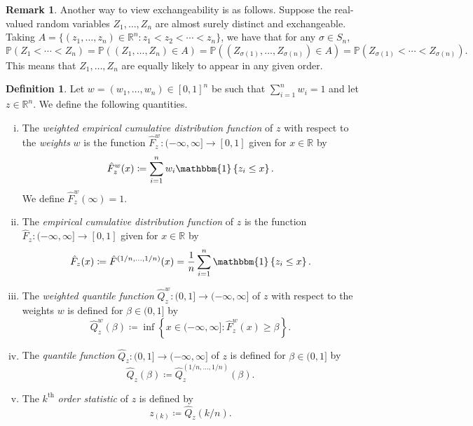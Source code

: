 \documentclass[11pt, titlepage]{article} %
\newcommand{\R}{\mathrm}
\newcommand{\Prob}[1]{\mathbb{P}\left( #1 \right)}
\newcommand{\Ind}[1]{\mathbbm{1}\left\{ #1 \right\}}
\numberwithin{equation}{section}
\theoremstyle{definition}
\newtheorem{definition}{Definition}
\newtheorem{remark}{Remark}
\numberwithin{theorem}{section}
\numberwithin{lemma}{section}
\numberwithin{corollary}{section}
\numberwithin{proposition}{section}
\numberwithin{definition}{section}
\numberwithin{remark}{section}
\begin{document}
\begin{remark}
    Another way to view exchangeability is as follows. Suppose the real-valued random variables \(Z_1, \ldots, Z_n\) are almost surely distinct and exchangeable. Taking \(A = \{(z_1, \ldots, z_n) \in \mathbb{R}^n : z_1 < z_2 < \cdots < z_n \}\), we have that for any \(\sigma \in S_n\), \[\Prob{Z_1 < \cdots < Z_n} = \Prob{(Z_1, \ldots, Z_n) \in A} = \Prob{(Z_{\sigma(1)}, \ldots, Z_{\sigma(n)}) \in A} = \Prob{Z_{\sigma(1)} < \cdots < Z_{\sigma(n)}}.\] This means that \(Z_1, \ldots, Z_n\) are equally likely to appear in any given order.
\label{rmk:exch_ordering}
\end{remark}


\begin{definition}
    Let \(w = (w_1, \ldots, w_n) \in [0,1]^n\) be such that \(\sum_{i=1}^n w_i = 1\) and let \(z \in \mathbb{R}^n\). We define the following quantities. \begin{enumerate}[(i)] \itemsep0em
        \item The \textit{weighted empirical cumulative distribution function} of \(z\) with respect to the \textit{weights} \(w\) is the function \(\hat{F}^w_z: (-\infty, \infty] \to [0,1]\) given for \(x \in \mathbb{R}\) by \[\hat{F}^{w}_z(x) \coloneqq \sum_{i=1}^n w_i \Ind{z_i \leq x}.  \] We define \(\hat{F}^w_z(\infty) = 1\).
        \item The \textit{empirical cumulative distribution function} of \(z\) is the function \(\hat{F}_z: (-\infty, \infty] \to [0,1]\) given for \(x \in \mathbb{R}\) by \[\hat{F}_z(x) \coloneqq \hat{F}^{(1/n, \ldots, 1/n)}(x) = \frac{1}{n}\sum_{i=1}^n \Ind{z_i \leq x}.\]
        \item The \textit{weighted quantile function} \(\hat{Q}^w_z:(0,1] \to (-\infty, \infty]\) of \(z\) with respect to the weights \(w\) is defined for \(\beta \in (0,1]\) by \[\hat{Q}^w_z(\beta) \coloneqq \inf \left\{ x \in (-\infty, \infty]: \hat{F}^w_z(x) \geq \beta \right\}.\]
        \item The \textit{quantile function} \(\hat{Q}_z:(0,1] \to (-\infty, \infty]\) of \(z\) is defined for \(\beta \in (0,1]\) by \[\hat{Q}_z(\beta) \coloneqq \hat{Q}^{(1/n, \ldots, 1/n)}_z(\beta).\]
        \item The \(k^{\R{th}}\) \textit{order statistic} of \(z\) is defined by \[z_{(k)} \coloneqq \hat{Q}_z(k/n).\]
    \end{enumerate}
\label{defn:empirical_cdfquantile}
\end{definition}
\end{document}

